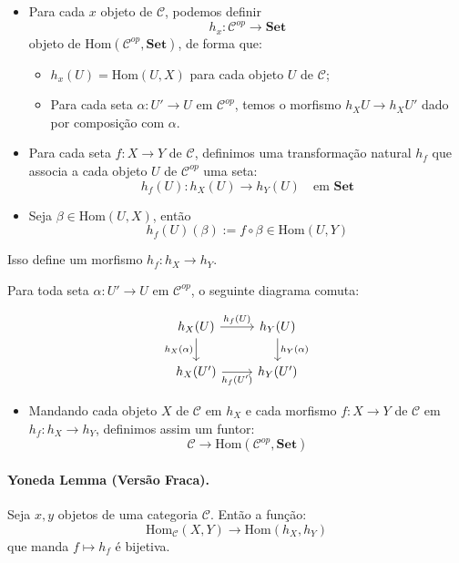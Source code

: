 \documentclass{article}
\theoremstyle{plain}                    %
\theoremstyle{definition}
\theoremstyle{remark}
\begin{document}
\begin{itemize}
    \item Para cada $x$ objeto de $\mathcal{C}$, podemos definir
    \[
    h_x : \mathcal{C}^{op} \to \mathbf{Set}
    \]
    objeto de $\text{Hom}(\mathcal{C}^{op}, \mathbf{Set})$, de forma que:
    \begin{itemize}
        \item $h_x(U) = \text{Hom}(U, X)$ para cada objeto $U$ de $\mathcal{C}$;
        \item Para cada seta $\alpha : U' \to U$ em $\mathcal{C}^{op}$, temos o morfismo $h_X U \to h_X U'$ dado por composição com $\alpha$.
    \end{itemize}
    
    \item Para cada seta $f : X \to Y$ de $\mathcal{C}$, definimos uma transformação natural $h_f$ que associa a cada objeto $U$ de $\mathcal{C}^{op}$ uma seta:
    \[
    h_f(U) : h_X(U) \to h_Y(U) \quad \text{em } \mathbf{Set}
    \]
    \item Seja $\beta \in \text{Hom}(U, X)$, então
    \[
    h_f(U)(\beta) := f \circ \beta \in \text{Hom}(U, Y)
    \]
\end{itemize}

Isso define um morfismo $h_f : h_X \to h_Y$.

Para toda seta $\alpha : U' \to U$ em $\mathcal{C}^{op}$, o seguinte diagrama comuta:

\[
\begin{tikzcd}
h_X(U) \arrow[r, "h_f(U)"] \arrow[d, "h_X(\alpha)"'] & h_Y(U) \arrow[d, "h_Y(\alpha)"] \\
h_X(U') \arrow[r, "h_f(U')"'] & h_Y(U')
\end{tikzcd}
\]

\begin{itemize}
    \item Mandando cada objeto $X$ de $\mathcal{C}$ em $h_X$ e cada morfismo $f : X \to Y$ de $\mathcal{C}$ em $h_f : h_X \to h_Y$, definimos assim um funtor:
    \[
    \mathcal{C} \to \text{Hom}(\mathcal{C}^{op}, \mathbf{Set})
    \]
\end{itemize}

\paragraph{Yoneda Lemma (Versão Fraca).} Seja $x, y$ objetos de uma categoria $\mathcal{C}$. Então a função:
\[
\text{Hom}_{\mathcal{C}}(X, Y) \to \text{Hom}(h_X, h_Y)
\]
que manda $f \mapsto h_f$ é bijetiva.
\end{document}
